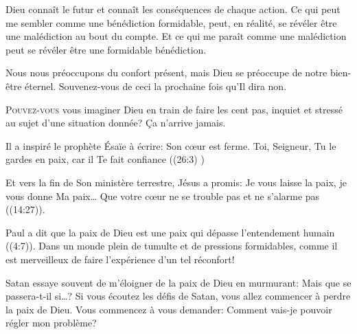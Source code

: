 Dieu connaît le futur et connaît les conséquences de chaque action.
 Ce qui peut me sembler comme une bénédiction formidable, peut,
 en réalité, se révéler être une malédiction au bout du compte.
 Et ce qui me paraît comme une malédiction peut se révéler
 être une formidable bénédiction. 

Nous nous préoccupons du confort présent, mais Dieu se préoccupe
 de notre bien-être éternel.
 Souvenez-vous de ceci la prochaine fois qu'Il dira \Og non. \Fg{}

\dvrule






\lettrine{P}{ouvez-vous} vous imaginer Dieu en train de faire les cent pas,
 inquiet et stressé au sujet d'une situation donnée? Ça n'arrive jamais. 

Il a inspiré le prophète Ésaïe à écrire: 
 \Og Son c\oe{}ur est ferme. Toi, Seigneur, Tu le gardes en paix,
 car il Te fait confiance \Fg{}
 ((26:3) \BFC) 


Et vers la fin de Son ministère terrestre, Jésus a promis:
 \Og Je vous laisse la paix, je vous donne Ma paix\dots{}
 Que votre c\oe{}ur ne se trouble pas et ne s'alarme pas \Fg{}
 ((14:27)). 

Paul a dit que la paix de Dieu est une paix qui dépasse l'entendement humain
 ((4:7)).
 Dans un monde plein de tumulte et de pressions formidables,
 comme il est merveilleux de faire l'expérience d'un tel réconfort! 

Satan essaye souvent de m'éloigner de la paix de Dieu en murmurant:
 \Og Mais que se passera-t-il si\dots{}? \Fg{} 
 Si vous écoutez les défis de Satan, vous allez commencer
 à perdre la paix de Dieu. Vous commencez à vous demander:
 \Og Comment vais-je pouvoir régler mon problème? \Fg{} 

